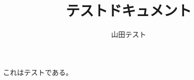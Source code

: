 \documentclass{jsarticle}
\title{テストドキュメント}
\author{山田テスト}
\begin{document}
\maketitle

これはテストである。
\end{document}
